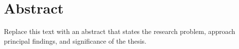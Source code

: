 \chapter*{Abstract}

Replace this text with an abstract that states the research problem, approach principal findings, and significance of the thesis.

\cleardoublepage
